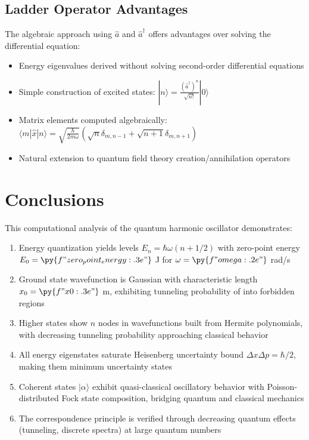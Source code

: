 \documentclass[a4paper, 11pt]{article}
\begin{document}
\subsection{Ladder Operator Advantages}

The algebraic approach using $\hat{a}$ and $\hat{a}^\dagger$ offers advantages over solving
the differential equation:
\begin{itemize}
\item Energy eigenvalues derived without solving second-order differential equations
\item Simple construction of excited states: $|n\rangle = \frac{(\hat{a}^\dagger)^n}{\sqrt{n!}}|0\rangle$
\item Matrix elements computed algebraically: $\langle m|\hat{x}|n\rangle = \sqrt{\frac{\hbar}{2m\omega}}(\sqrt{n}\delta_{m,n-1} + \sqrt{n+1}\delta_{m,n+1})$
\item Natural extension to quantum field theory creation/annihilation operators
\end{itemize}

\section{Conclusions}

This computational analysis of the quantum harmonic oscillator demonstrates:

\begin{enumerate}
\item Energy quantization yields levels $E_n = \hbar\omega(n + 1/2)$ with zero-point energy
      $E_0 = \py{f"{zero_point_energy:.3e}"}$ J for $\omega = \py{f"{omega:.2e}"}$ rad/s

\item Ground state wavefunction is Gaussian with characteristic length $x_0 = \py{f"{x0:.3e}"}$ m,
      exhibiting tunneling probability of  into forbidden regions

\item Higher states show $n$ nodes in wavefunctions built from Hermite polynomials,
      with decreasing tunneling probability approaching classical behavior

\item All energy eigenstates saturate Heisenberg uncertainty bound $\Delta x\Delta p = \hbar/2$,
      making them minimum uncertainty states

\item Coherent states $|\alpha\rangle$ exhibit quasi-classical oscillatory behavior with
      Poisson-distributed Fock state composition, bridging quantum and classical mechanics

\item The correspondence principle is verified through decreasing quantum effects
      (tunneling, discrete spectra) at large quantum numbers
\end{enumerate}
\end{document}
